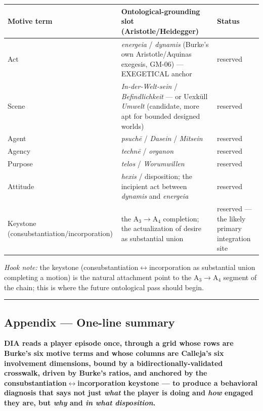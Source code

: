 \documentclass[11pt]{report}
\begin{document}
\begin{table}[H]
\renewcommand{\arraystretch}{1.25}
\begin{tabularx}{\textwidth}{>{\RaggedRight\arraybackslash}X>{\RaggedRight\arraybackslash}X>{\RaggedRight\arraybackslash}X}
\toprule
Motive term & Ontological-grounding slot (Aristotle/Heidegger) & Status \\
\midrule
Act & \textit{energeia} / \textit{dynamis} (Burke's own Aristotle/Aquinas exegesis, GM-06) — EXEGETICAL anchor & reserved \\
Scene & \textit{In-der-Welt-sein} / \textit{Befindlichkeit} — or Uexküll \textit{Umwelt} (candidate, more apt for bounded designed worlds) & reserved \\
Agent & \textit{psuchē} / \textit{Dasein} / \textit{Mitsein} & reserved \\
Agency & \textit{technē} / \textit{organon} & reserved \\
Purpose & \textit{telos} / \textit{Worumwillen} & reserved \\
Attitude & \textit{hexis} / disposition; the incipient act between \textit{dynamis} and \textit{energeia} & reserved \\
Keystone (consubstantiation/incorporation) & the A$_3$$\rightarrow$\allowbreak A$_4$ completion; the actualization of desire as substantial union & reserved — the likely primary integration site \\
\bottomrule
\end{tabularx}
\end{table}


\textit{Hook note:} the keystone (consubstantiation$\leftrightarrow$\allowbreak incorporation as substantial union completing a motion) is the natural attachment point to the A$_3$$\rightarrow$\allowbreak A$_4$ segment of the chain; this is where the future ontological pass should begin.


\vspace{0.4em}\hrule\vspace{0.8em}


\subsection{Appendix — One-line summary}


\textbf{DIA reads a player episode once, through a grid whose rows are Burke's six motive terms and whose columns are Calleja's six involvement dimensions, bound by a bidirectionally-validated crosswalk, driven by Burke's ratios, and anchored by the consubstantiation$\leftrightarrow$\allowbreak incorporation keystone — to produce a behavioral diagnosis that says not just \textit{what} the player is doing and \textit{how} engaged they are, but \textit{why} and \textit{in what disposition}.}
\end{document}
